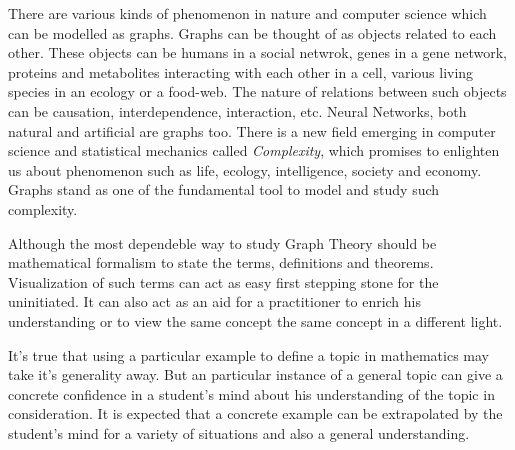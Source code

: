 There are various kinds of phenomenon in nature and computer science which can
be modelled as graphs. Graphs can be thought of as objects related to each
other. These objects can be humans in a social netwrok, genes in a gene
network, proteins and metabolites interacting with each other in a cell,
various living species in an ecology or a food-web. The nature of relations
between such objects can be causation, interdependence, interaction, etc.
Neural Networks, both natural and artificial are graphs too. There is a new
field emerging in computer science and statistical mechanics called
\emph{Complexity}, which promises to enlighten us about phenomenon such as
life, ecology, intelligence, society and economy. Graphs stand as one of the
fundamental tool to model and study such complexity.


Although the most dependeble way to study Graph Theory should be mathematical
formalism to state the terms, definitions and theorems. Visualization of such
terms can act as easy first stepping stone for the uninitiated. It can also act
as an aid for a practitioner to enrich his understanding or to view the same
concept the same concept in a different light.

It's true that using a particular example to define a topic in mathematics may
take it's generality away. But an particular instance of a general topic can
give a concrete confidence in a student's mind about his understanding of the
topic in consideration. It is expected that a concrete example can be
extrapolated by the student's mind for a variety of situations and also a
general understanding.



%
